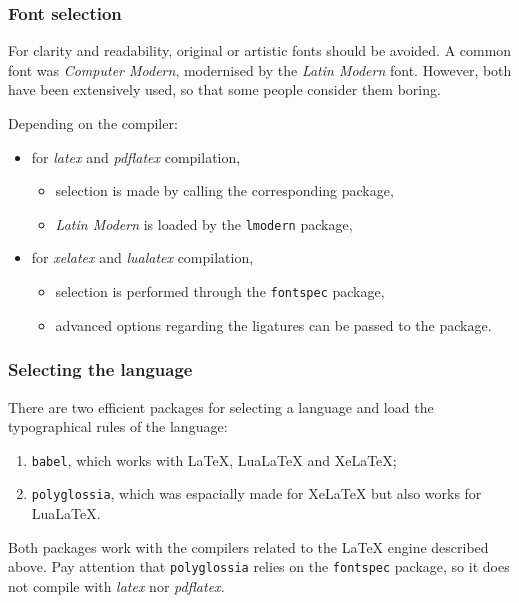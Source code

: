 \documentclass[11pt]{beamer}
\begin{document}
\begin{frame}
	\frametitle{Font selection}
	
	For clarity and readability, original or artistic fonts should be avoided.
	A common font was \textit{Computer Modern}, modernised by the \textit{Latin Modern} font. However, both have been extensively used, so that some people consider them boring.
	
	Depending on the compiler:
	\begin{itemize}
		\item for \textit{latex} and \textit{pdflatex} compilation,
		\begin{itemize}
			\item selection is made by calling the corresponding package,
			\item \textit{Latin Modern} is loaded by the \texttt{lmodern} package,
		\end{itemize}
		\item for \textit{xelatex} and \textit{lualatex} compilation,
		\begin{itemize}
			\item selection is performed through the \texttt{fontspec} package,
			\item advanced options regarding the ligatures can be passed to the package.
		\end{itemize}
	\end{itemize}
\end{frame}


\begin{frame}
	\frametitle{Selecting the language}
	
	There are two efficient packages for selecting a language and load the typographical rules of the language:
	\begin{enumerate}
		\item \texttt{babel}, which works with LaTeX, LuaLaTeX and XeLaTeX;
		\item \texttt{polyglossia}, which was espacially made for XeLaTeX but also works for LuaLaTeX.
	\end{enumerate}
	
	Both packages work with the compilers related to the LaTeX engine described above. Pay attention that \texttt{polyglossia} relies on the \texttt{fontspec} package, so it does not compile with \textit{latex} nor \textit{pdflatex}.
\end{frame}
\end{document}
